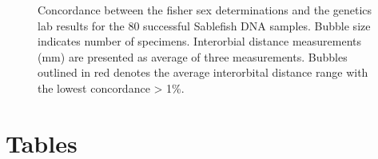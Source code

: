 \documentclass[12pt]{article}\usepackage[]{graphicx}\usepackage[]{color}
\begin{document}
\begin{figure}[htb]

 \hfill{}

\caption{Concordance between the fisher sex determinations and the genetics lab results for the 80 successful Sablefish DNA samples. Bubble size indicates number of specimens. Interorbial distance measurements (mm) are presented as average of three measurements. Bubbles outlined in red denotes the average interorbital distance range with the lowest concordance \textgreater{} 1\%.}\label{fig:figure5}
\end{figure}
\clearpage

\hypertarget{tables}{%
\section{Tables}\label{tables}}
\end{document}
